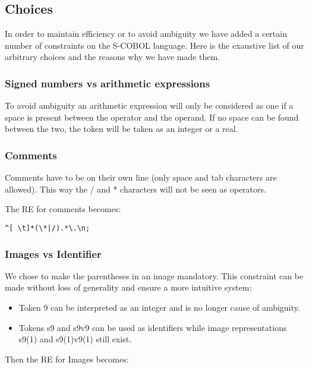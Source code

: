 \subsection{Choices}

In order to maintain efficiency or to avoid ambiguity we have added a certain number of constraints on the S-COBOL language. Here is the exaustive list of our arbitrary choices and the reasons why we have made them.

\subsubsection{Signed numbers vs arithmetic expressions}

To avoid ambiguity an arithmetic expression will only be considered as one if a space is present between the operator and the operand. If no space can be found between the two, the token will be taken as an integer or a real.

\subsubsection{Comments}
\label{sec:impl:choices:comments}

Comments have to be on their own line (only space and tab characters are allowed). This way the / and * characters will not be seen as operators.

The RE for comments becomes:

\begin{verbatim}
^[ \t]*(\*|/).*\.\n;
\end{verbatim}

\subsubsection{Images vs Identifier}

We chose to make the parentheses in an image mandatory. This constraint can be made without loss of generality and ensure a more intuitive system:

\begin{itemize}
	\item Token 9 can be interpreted as an integer and is no longer cause of ambiguity.
	\item Tokens s9 and s9v9 can be used as identifiers while image representations s9(1) and s9(1)v9(1) still exist.  
\end{itemize}

Then the RE for Images becomes:

